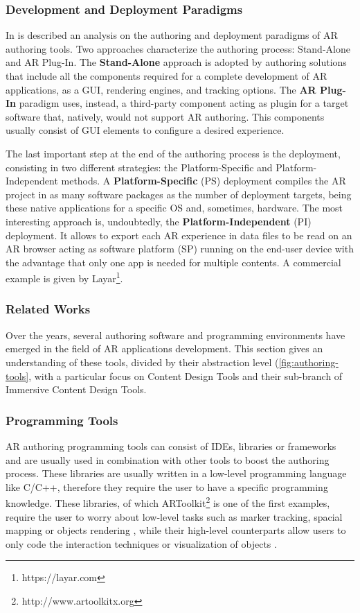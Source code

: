 \subsubsection{Development and Deployment Paradigms}
In \cite{marcus_authoring_2016} is described an analysis on the authoring and deployment paradigms of AR authoring tools. Two approaches characterize the authoring process: Stand-Alone and AR Plug-In.
The \textbf{Stand-Alone} approach is adopted by authoring solutions that include all the components required for a complete development of AR applications, as a GUI, rendering engines, and tracking options. The \textbf{AR Plug-In} paradigm uses, instead, a third-party component acting as plugin for a target software that, natively, would not support AR authoring. This components usually consist of GUI elements to configure a desired experience.

The last important step at the end of the authoring process is the deployment, consisting in two different strategies: the Platform-Specific and Platform-Independent methods. A \textbf{Platform-Specific} (PS) deployment compiles the AR project in as many software packages as the number of deployment targets, being these native applications for a specific OS and, sometimes, hardware. 
The most interesting approach is, undoubtedly, the \textbf{Platform-Independent} (PI) deployment. It allows to export each AR experience in data files to be read on an AR browser acting as software platform (SP) running on the end-user device with the advantage that only one app is needed for multiple contents. A commercial example is given by Layar\footnote{https://layar.com}.

\subsubsection{Related Works}
\label{sec:related-works}
Over the years, several authoring software and programming environments have emerged in the field of AR applications development. This section gives an understanding of these tools, divided by their abstraction level (\autoref{fig:authoring-tools}, with a particular focus on Content Design Tools and their sub-branch of Immersive Content Design Tools.
\subsubsection{Programming Tools}
\label{subsec:related-programming-tools}
AR authoring programming tools can consist of IDEs, libraries or frameworks and are usually used in combination with other tools to boost the authoring process.
These libraries are usually written in a low-level programming language like C/C++, therefore they require the user to have a specific programming knowledge. These libraries, of which ARToolkit\footnote{http://www.artoolkitx.org} \cite{kato1999marker} is one of the first examples, require the user to worry about low-level tasks such as marker tracking, spacial mapping or objects rendering \cite{stephanidis_authoring_2020},  while their high-level counterparts allow users to only code the interaction techniques or visualization of objects \cite{stephanidis_authoring_2020}.

